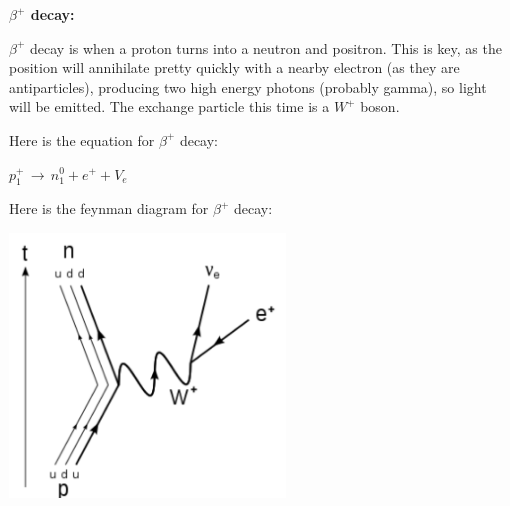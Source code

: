 \documentclass[a4paper, 12pt]{article}
\begin{document}
\textbf{$\beta^+$ decay:}

$\beta^+$ decay is when a proton turns into a neutron and positron. This is key, as the position will annihilate pretty quickly with a nearby electron (as they are antiparticles), producing two high energy photons (probably gamma), so light will be emitted. The exchange particle this time is a $W^+$ boson.

Here is the equation for $\beta^+$ decay:

$p^+_1 \, \rightarrow \, n^0_1 + e^+ + V_e$

Here is the feynman diagram for $\beta^+$ decay:

\begin{center}
\includegraphics[height=7cm]{betaPlus.png}
\end{center}
\end{document}
